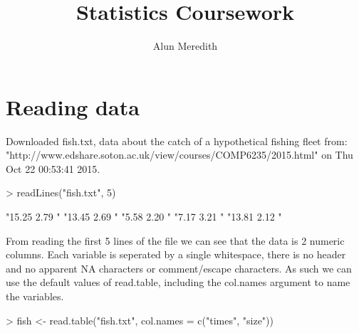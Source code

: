 \documentclass{article}
\begin{document}



\title{Statistics Coursework}
\author{Alun Meredith}
\maketitle
\section{Reading data}
Downloaded fish.txt, data about the catch of a hypothetical fishing fleet from:\\"http://www.edshare.soton.ac.uk/view/courses/COMP6235/2015.html" on Thu Oct 22 00:53:41 2015. 
\begin{Schunk}
\begin{Sinput}
> readLines("fish.txt", 5)
\end{Sinput}
\begin{Soutput}
[1] "15.25 2.79 " "13.45 2.69 " "5.58 2.20 "  "7.17 3.21 "  "13.81 2.12 "
\end{Soutput}
\end{Schunk}
From reading the first 5 lines of the file we can see that the data is 2 numeric columns. Each variable is seperated by a single whitespace, there is no header and no apparent NA characters or comment/escape characters. As such we can use the default values of read.table, including the col.names argument to name the variables.
\begin{Schunk}
\begin{Sinput}
> fish <- read.table("fish.txt", col.names = c("times", "size"))
\end{Sinput}
\end{Schunk}
\end{document}

